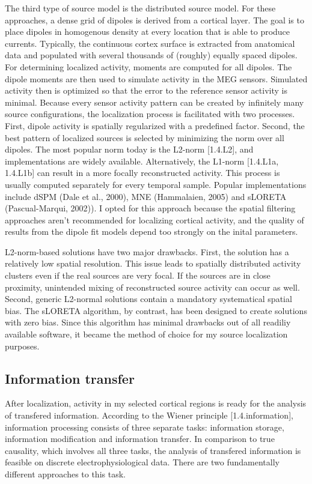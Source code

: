The third type of source model is the distributed source model.
For these approaches, a dense grid of dipoles is derived from a cortical layer.
The goal is to place dipoles in homogenous density at every location that is able to produce currents.
Typically, the continuous cortex surface is extracted from anatomical data and populated with several thousands of (roughly) equally spaced dipoles.
For determining localized activity, moments are computed for all dipoles.
The dipole moments are then used to simulate activity in the MEG sensors.
Simulated activity then is optimized so that the error to the reference sensor activity is minimal.
Because every sensor activity pattern can be created by infinitely many source configurations, the localization process is facilitated with two processes.
First, dipole activity is spatially regularized with a predefined factor.
Second, the best pattern of localized sources is selected by minimizing the norm over all dipoles.
The most popular norm today is the L2-norm [1.4.L2], and implementations are widely available.
Alternatively, the L1-norm [1.4.L1a, 1.4.L1b] can result in a more focally reconstructed activity.
This process is usually computed separately for every temporal sample.
Popular implementations include dSPM (Dale et al., 2000), MNE (Hammalaien, 2005) and sLORETA (Pascual-Marqui, 2002)).
I opted for this approach because the spatial filtering approaches aren't recommended for localizing cortical activity, and the quality of results from the dipole fit models depend too strongly on the inital parameters.

L2-norm-based solutions have two major drawbacks.
First, the solution has a relatively low spatial resolution.
This issue leads to spatially distributed activity clusters even if the real sources are very focal.
If the sources are in close proximity, unintended mixing of reconstructed source activity can occur as well.
Second, generic L2-normal solutions contain a mandatory systematical spatial bias.
The sLORETA algorithm, by contrast, has been designed to create solutions with zero bias.
Since this algorithm has minimal drawbacks out of all readiliy available software, it became the method of choice for my source localization purposes.

\subsection{Information transfer}
After localization, activity in my selected cortical regions is ready for the analysis of transfered information.
According to the Wiener principle [1.4.information], information processing consists of three separate tasks: information storage, information modification and information transfer.
In comparison to true causality, which involves all three tasks, the analysis of transfered information is feasible on discrete electrophysiological data. 
There are two fundamentally different approaches to this task.


